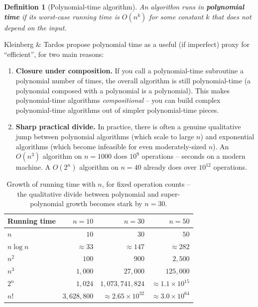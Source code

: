 \documentclass[11pt]{article}
\newtheorem{definition}[theorem]{Definition}
\begin{document}
\begin{definition}[Polynomial-time algorithm]
An algorithm runs in \textbf{polynomial time} if its worst-case running time is $O(n^k)$
for some constant $k$ that does not depend on the input.
\end{definition}

Kleinberg \& Tardos propose polynomial time as a useful (if imperfect) proxy for
``efficient'', for two main reasons:

\begin{enumerate}
    \item \textbf{Closure under composition.} If you call a polynomial-time subroutine a
    polynomial number of times, the overall algorithm is still polynomial-time (a
    polynomial composed with a polynomial is a polynomial). This makes polynomial-time
    algorithms \emph{compositional} -- you can build complex polynomial-time algorithms out
    of simpler polynomial-time pieces.
    \item \textbf{Sharp practical divide.} In practice, there is often a genuine
    qualitative jump between polynomial algorithms (which scale to large $n$) and
    exponential algorithms (which become infeasible for even moderately-sized $n$). An
    $O(n^3)$ algorithm on $n = 1000$ does $10^9$ operations -- seconds on a modern machine.
    A $O(2^n)$ algorithm on $n = 40$ already does over $10^{12}$ operations.
\end{enumerate}

\begin{table}[h]
\centering
\begin{tabular}{@{}lrrr@{}}
\toprule
Running time & $n=10$ & $n=30$ & $n=50$ \\
\midrule
$n$       & $10$        & $30$         & $50$ \\
$n \log n$ & $\approx 33$ & $\approx 147$ & $\approx 282$ \\
$n^2$     & $100$       & $900$        & $2{,}500$ \\
$n^3$     & $1{,}000$   & $27{,}000$   & $125{,}000$ \\
$2^n$     & $1{,}024$   & $1{,}073{,}741{,}824$ & $\approx 1.1 \times 10^{15}$ \\
$n!$      & $3{,}628{,}800$ & $\approx 2.65 \times 10^{32}$ & $\approx 3.0 \times 10^{64}$ \\
\bottomrule
\end{tabular}
\caption{Growth of running time with $n$, for fixed operation counts -- the qualitative
divide between polynomial and super-polynomial growth becomes stark by $n=30$.}
\end{table}
\end{document}
